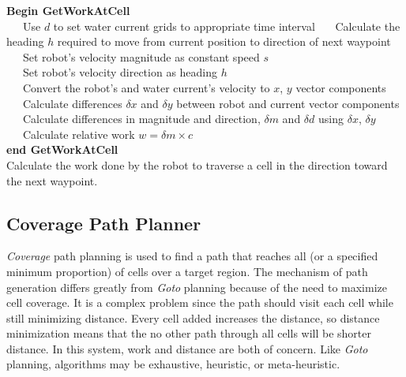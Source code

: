 \documentclass{tamuccthesis}
\begin{document}
\begin{algorithm}%
\textbf{Begin GetWorkAtCell}\\
~~~Use $d$ to set water current grids to appropriate time interval
~~~Calculate the heading $h$ required to move from current position to direction of next waypoint \\
~~~Set robot's velocity magnitude as constant speed $s$ \\
~~~Set robot's velocity direction as heading $h$ \\
~~~Convert the robot's and water current's velocity to $x$, $y$ vector components \\
~~~Calculate differences $\delta x$ and $\delta y$ between robot and current vector components \\
~~~Calculate differences in magnitude and direction, $\delta m$ and $\delta d$ using $\delta x$, $\delta y$ \\
~~~Calculate relative work $w = \delta m \times c$ \\
\textbf{end GetWorkAtCell} \\
\caption[Calculate work to traverse a cell.]{Calculate the work done by the robot to traverse a cell in the direction toward the next waypoint.} 
\label{alg:getworkatcell}
\end{algorithm}



\subsection{Coverage Path Planner}

\textit{Coverage} path planning is used to find a path that reaches all (or a specified minimum proportion) of cells over a target region. The mechanism of path generation differs greatly from \textit{Goto} planning because of the need to maximize cell coverage. It is a complex problem since the path should visit each cell while still minimizing distance. Every cell added increases the distance, so distance minimization means that the no other path through all cells will be shorter distance. In this system, work and distance are both of concern. Like \textit{Goto} planning, algorithms may be exhaustive, heuristic, or meta-heuristic. 
\end{document}
